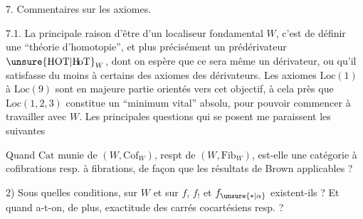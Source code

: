 7. Commentaires sur les axiomes.

7.1. La principale raison d'être d'un localiseur fondamental $W$, c'est de définir une ``théorie d'homotopie'', et plus précisément un prédérivateur $\unsure{\mathrm{HOT}|\mathrm{H\!oT}}_W$, dont on espère que ce sera même un dérivateur, ou qu'il satisfasse du moins à certains des axiomes des dérivateurs. Les axiomes $\mathrm{Loc}(1)$ à $\mathrm{Loc}(9)$ sont en majeure partie orientés vers cet objectif, à cela près que $\mathrm{Loc}(1,2,3)$ constitue un ``minimum vital'' absolu, pour pouvoir commencer à travailler avec $W$. Les principales questions qui se posent  me paraissent les suivantes

 Quand $\mathrm{Cat}$ munie de $(W,\mathrm{Cof}_W)$, respt de $(W,\mathrm{Fib}_W)$, est-elle une catégorie à cofibrations resp. à fibrations, de façon que les résultats de  Brown  applicables ?

2) Sous quelles conditions, sur $W$ et sur $f$, $f_!$ et $f_{\unsure{*|\alpha}}$ existent-ils ? Et quand a-t-on, de plus, exactitude des carrés cocartésiens resp.  ?

